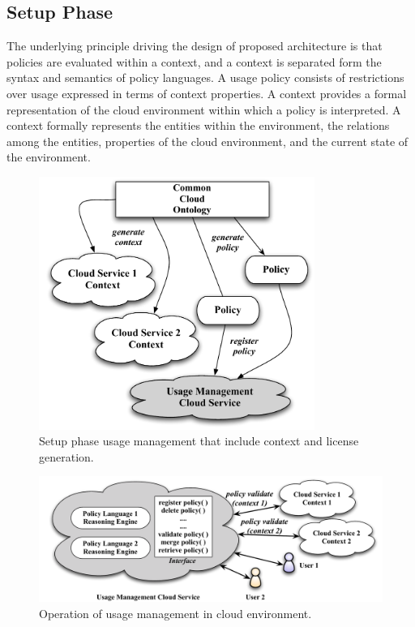 \documentclass[10pt, conference, compsocconf]{IEEEtran}
\begin{document}
\subsection{Setup Phase}
The underlying principle driving the design of proposed architecture is that policies are evaluated within a context, and a context is separated form the syntax and semantics of policy languages. A usage policy consists of restrictions over usage expressed in terms of  context properties.  A context provides a formal representation of the cloud environment within which a policy is interpreted. A context formally represents the entities within the environment, the relations among the entities, properties of the cloud environment, and the current state of the environment. 

\begin{figure}[t]
\centering
\includegraphics[width=9cm]{cloud-setup}
\caption{Setup phase usage management that include context and license generation.}
\label{fig:cloud-setup}
\end{figure}

\begin{figure}[!t]
\centering
\includegraphics[width=13cm]{cloud-working}
\caption{Operation of usage management in cloud environment.}
\label{fig:cloud-working}
\end{figure}
\end{document}
